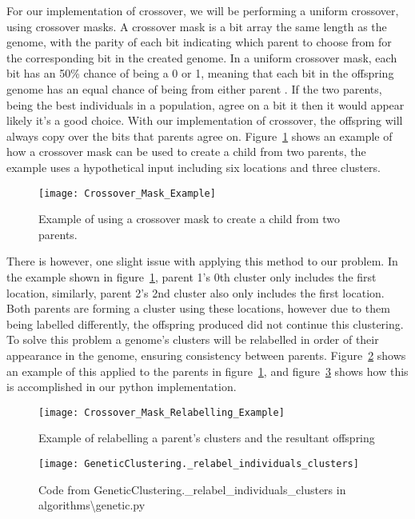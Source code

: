 \noindent
For our implementation of crossover, we will be performing a uniform crossover, using crossover masks.
A crossover mask is a bit array the same length as the genome, with the parity of each bit indicating which parent
to choose from for the corresponding bit in the created genome.
In a uniform crossover mask, each bit has an 50\% chance of being a 0 or 1, meaning that each bit in the offspring
genome has an equal chance of being from either parent
.
If the two parents, being the best individuals in a population, agree on a bit it then it would appear likely it's a
good choice.
With our implementation of crossover, the offspring will always copy over the bits that parents agree on.
Figure~\ref{fig:Crossover_Mask_Example} shows an example of how a crossover mask can be used to create a child from
two parents, the example uses a hypothetical input including six locations and three clusters.
\begin{figure}[H]
    \centering
    \texttt{[image: Crossover\_Mask\_Example]}
    \caption{Example of using a crossover mask to create a child from two parents.}\label{fig:Crossover_Mask_Example}
\end{figure}

\noindent
There is however, one slight issue with applying this method to our problem.
In the example shown in figure~\ref{fig:Crossover_Mask_Example}, parent 1's 0th cluster only includes the first
location, similarly, parent 2's 2nd cluster also only includes the first location.
Both parents are forming a cluster using these locations, however due to them being labelled differently, the
offspring produced did not continue this clustering.
To solve this problem a genome's clusters will be relabelled in order of their appearance in the genome, ensuring
consistency between parents.
Figure~\ref{fig:Crossover_Mask_Relabelling_Example} shows an example of this applied to the parents in figure~\ref{fig:Crossover_Mask_Example},
and figure~\ref{fig:GeneticClustering._relabel_individuals_clusters} shows how this is accomplished in our python
implementation.
\begin{figure}[H]
    \centering
    \texttt{[image: Crossover\_Mask\_Relabelling\_Example]}
    \caption{Example of relabelling a parent's clusters and the resultant offspring}\label{fig:Crossover_Mask_Relabelling_Example}
\end{figure}
\begin{figure}[H]
    \centering
    \texttt{[image: GeneticClustering.\_relabel\_individuals\_clusters]}
    \caption{Code from GeneticClustering.\_relabel\_individuals\_clusters in algorithms\textbackslash genetic.py}\label{fig:GeneticClustering._relabel_individuals_clusters}
\end{figure}

